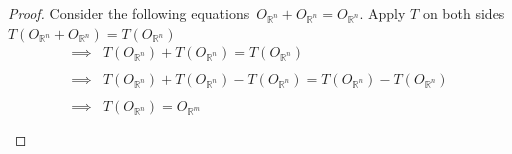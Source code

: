 \documentclass[11pt,a4paper]{article}
\theoremstyle{definition}
\begin{document}
\begin{proof}
Consider the following equations $\, O_{\mathbb{R}^n}  + O_{\mathbb{R}^n} = O_{\mathbb{R}^n}$. Apply $T$ on both sides\\ $T(O_{\mathbb{R}^n} + O_{\mathbb{R}^n}) = T(O_{\mathbb{R}^n})$
\begin{align*}
\implies & T(O_{\mathbb{R}^n}) + T(O_{\mathbb{R}^n}) = T(O_{\mathbb{R}^n})\\\\
\implies &  T(O_{\mathbb{R}^n})  + T(O_{\mathbb{R}^n}) - T(O_{\mathbb{R}^n}) = T(O_{\mathbb{R}^n}) - T(O_{\mathbb{R}^n})\\\\
\implies & T(O_{\mathbb{R}^n}) = O_{\mathbb{R}^m}\\\\
\end{align*}







\vspace{2cm}
\end{proof}
\end{document}
